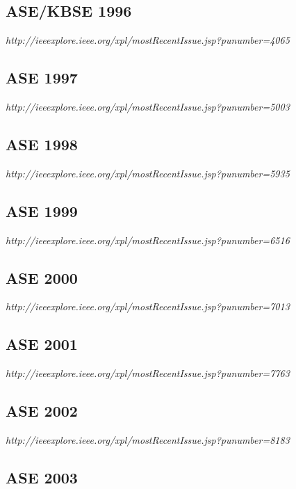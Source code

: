 \subsection{ASE/KBSE 1996}

{\small \em http://ieeexplore.ieee.org/xpl/mostRecentIssue.jsp?punumber=4065}

\subsection{ASE 1997}

{\small \em http://ieeexplore.ieee.org/xpl/mostRecentIssue.jsp?punumber=5003}

\subsection{ASE 1998}

{\small \em http://ieeexplore.ieee.org/xpl/mostRecentIssue.jsp?punumber=5935}

\subsection{ASE 1999}

{\small \em http://ieeexplore.ieee.org/xpl/mostRecentIssue.jsp?punumber=6516}

\subsection{ASE 2000}

{\small \em http://ieeexplore.ieee.org/xpl/mostRecentIssue.jsp?punumber=7013}

\subsection{ASE 2001}

{\small \em http://ieeexplore.ieee.org/xpl/mostRecentIssue.jsp?punumber=7763}

\subsection{ASE 2002}

{\small \em http://ieeexplore.ieee.org/xpl/mostRecentIssue.jsp?punumber=8183}

\subsection{ASE 2003}

